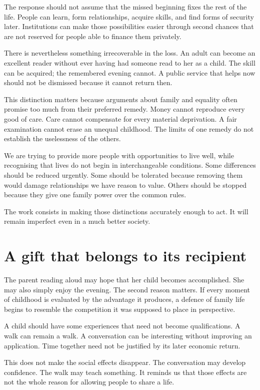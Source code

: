 \documentclass[12pt,a4paper]{book}
\begin{document}
The response should not assume that the missed beginning fixes the rest of the life. People can learn, form relationships, acquire skills, and find forms of security later. Institutions can make those possibilities easier through second chances that are not reserved for people able to finance them privately.

There is nevertheless something irrecoverable in the loss. An adult can become an excellent reader without ever having had someone read to her as a child. The skill can be acquired; the remembered evening cannot. A public service that helps now should not be dismissed because it cannot return then.

This distinction matters because arguments about family and equality often promise too much from their preferred remedy. Money cannot reproduce every good of care. Care cannot compensate for every material deprivation. A fair examination cannot erase an unequal childhood. The limits of one remedy do not establish the uselessness of the others.

We are trying to provide more people with opportunities to live well, while recognising that lives do not begin in interchangeable conditions. Some differences should be reduced urgently. Some should be tolerated because removing them would damage relationships we have reason to value. Others should be stopped because they give one family power over the common rules.

The work consists in making those distinctions accurately enough to act. It will remain imperfect even in a much better society.

\section*{A gift that belongs to its recipient}

The parent reading aloud may hope that her child becomes accomplished. She may also simply enjoy the evening. The second reason matters. If every moment of childhood is evaluated by the advantage it produces, a defence of family life begins to resemble the competition it was supposed to place in perspective.

A child should have some experiences that need not become qualifications. A walk can remain a walk. A conversation can be interesting without improving an application. Time together need not be justified by its later economic return.

This does not make the social effects disappear. The conversation may develop confidence. The walk may teach something. It reminds us that those effects are not the whole reason for allowing people to share a life.
\end{document}

